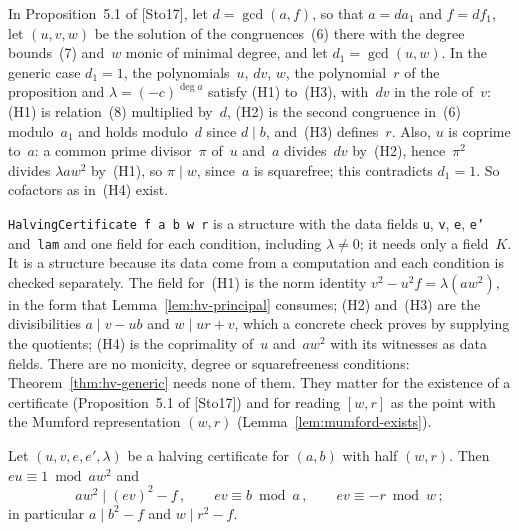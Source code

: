 In Proposition~5.1 of [Sto17], let $d = \gcd(a, f)$, so that $a = d a_1$ and $f = d f_1$, let
$(u, v, w)$ be the solution of the congruences~(6) there with the degree bounds~(7) and~$w$ monic
of minimal degree, and let $d_1 = \gcd(u, w)$. In the generic case $d_1 = 1$, the
polynomials~$u$, $dv$, $w$, the polynomial~$r$ of the proposition and $\lambda = (-c)^{\deg a}$
satisfy (H1) to~(H3), with~$dv$ in the role of~$v$: (H1) is relation~(8) multiplied by~$d$, (H2)
is the second congruence in~(6) modulo~$a_1$ and holds modulo~$d$ since $d \mid b$, and~(H3)
defines~$r$. Also, $u$ is coprime to~$a$: a common prime divisor~$\pi$ of~$u$ and~$a$
divides~$dv$ by~(H2), hence~$\pi^2$ divides $\lambda a w^2$ by~(H1), so $\pi \mid w$, since~$a$ is
squarefree; this contradicts $d_1 = 1$. So cofactors as in~(H4) exist.

\begin{remark}[Formalization]
\texttt{HalvingCertificate f a b w r} is a structure with the data fields \texttt{u}, \texttt{v},
\texttt{e}, \texttt{e'} and~\texttt{lam} and one field for each condition, including
$\lambda \ne 0$; it needs only a field~$K$. It is a structure because its data come from a
computation and each condition is checked separately. The field for~(H1) is the norm identity
$v^2 - u^2 f = \lambda (a w^2)$, in the form that Lemma~\ref{lem:hv-principal} consumes; (H2)
and~(H3) are the divisibilities $a \mid v - ub$ and $w \mid ur + v$, which a concrete check proves
by supplying the quotients; (H4) is the coprimality of~$u$ and~$aw^2$ with its witnesses as data
fields. There are no monicity, degree or squarefreeness conditions: Theorem~\ref{thm:hv-generic}
needs none of them. They matter for the existence of a certificate (Proposition~5.1 of [Sto17])
and for reading $[w, r]$ as the point with the Mumford representation $(w, r)$
(Lemma~\ref{lem:mumford-exists}).
\end{remark}

\begin{lemma}
\label{lem:hv-cert-mumford}
\leanok
{}
Let $(u, v, e, e', \lambda)$ be a halving certificate for $(a, b)$ with half $(w, r)$. Then
$eu \equiv 1 \bmod a w^2$ and
\[ a w^2 \mid (ev)^2 - f\,, \qquad ev \equiv b \bmod a\,, \qquad ev \equiv -r \bmod w\,; \]
in particular $a \mid b^2 - f$ and $w \mid r^2 - f$.
\end{lemma}

